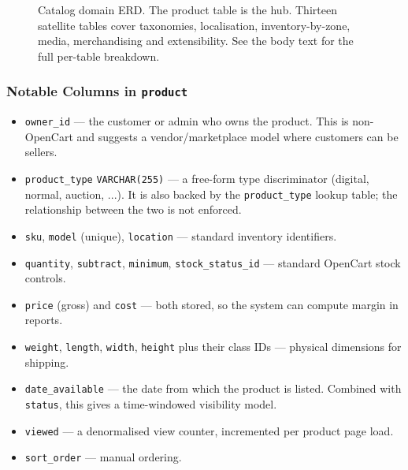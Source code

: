 \documentclass[11pt,a4paper]{article}
\begin{document}
\begin{figure}[htbp]
{%
}
\caption{Catalog domain ERD. The product table is the hub. Thirteen
satellite tables cover taxonomies, localisation, inventory-by-zone,
media, merchandising and extensibility. See the body text for the
full per-table breakdown.}
\label{fig:catalog}
\end{figure}

\subsubsection{Notable Columns in \texttt{product}}

\begin{itemize}[leftmargin=1.6em,itemsep=2pt]
  \item \texttt{owner\_id} --- the customer or admin who owns the product.
        This is non-OpenCart and suggests a vendor/marketplace model where
        customers can be sellers.
  \item \texttt{product\_type} \texttt{VARCHAR(255)} --- a free-form type
        discriminator (digital, normal, auction, ...). It is also backed
        by the \texttt{product\_type} lookup table; the relationship
        between the two is not enforced.
  \item \texttt{sku}, \texttt{model} (unique), \texttt{location} ---
        standard inventory identifiers.
  \item \texttt{quantity}, \texttt{subtract}, \texttt{minimum},
        \texttt{stock\_status\_id} --- standard OpenCart stock controls.
  \item \texttt{price} (gross) and \texttt{cost} --- both stored, so the
        system can compute margin in reports.
  \item \texttt{weight}, \texttt{length}, \texttt{width}, \texttt{height}
        plus their class IDs --- physical dimensions for shipping.
  \item \texttt{date\_available} --- the date from which the product is
        listed. Combined with \texttt{status}, this gives a
        time-windowed visibility model.
  \item \texttt{viewed} --- a denormalised view counter, incremented
        per product page load.
  \item \texttt{sort\_order} --- manual ordering.
\end{itemize}
\end{document}

